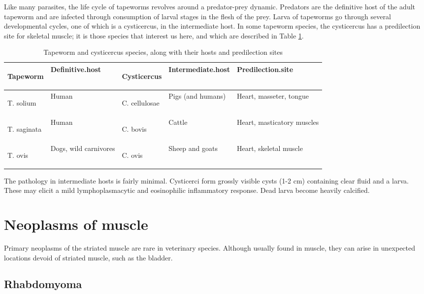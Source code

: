 \documentclass[openany]{book}
\begin{document}
Like many parasites, the life cycle of tapeworms revolves around a
predator-prey dynamic. Predators are the definitive host of the adult
tapeworm and are infected through consumption of larval stages in the
flesh of the prey. Larva of tapeworms go through several developmental
cycles, one of which is a cysticercus, in the intermediate host. In some
tapeworm species, the cysticercus has a predilection site for skeletal
muscle; it is those species that interest us here, and which are
described in Table \ref{tab:cysti}.

\begin{table}[t]

\caption{\label{tab:cysti}Tapeworm and cysticercus species, along with their hosts and predilection sites}
\centering
\begin{tabular}{>{\em\raggedright\arraybackslash}p{5em}>{\raggedright\arraybackslash}p{10em}>{\em\raggedright\arraybackslash}p{7em}>{\raggedright\arraybackslash}p{6em}l}
\toprule
Tapeworm & Definitive.host & Cysticercus & Intermediate.host & Predilection.site\\
\midrule
T. solium & Human & C. cellulosae & Pigs (and humans) & Heart, masseter, tongue\\
T. saginata & Human & C. bovis & Cattle & Heart, masticatory muscles\\
T. ovis & Dogs, wild carnivores & C. ovis & Sheep and goats & Heart, skeletal muscle\\
\bottomrule
\end{tabular}
\end{table}

The pathology in intermediate hosts is fairly minimal. Cysticerci form
grossly visible cysts (1-2 cm) containing clear fluid and a larva. These
may elicit a mild lymphoplasmacytic and eosinophilic inflammatory
response. Dead larva become heavily calcified.

\chapter{Neoplasms of muscle}\label{neoplasms-of-muscle}

Primary neoplasms of the striated muscle are rare in veterinary species.
Although usually found in muscle, they can arise in unexpected locations
devoid of striated muscle, such as the bladder.

\section{Rhabdomyoma}\label{rhabdomyoma}
\end{document}
